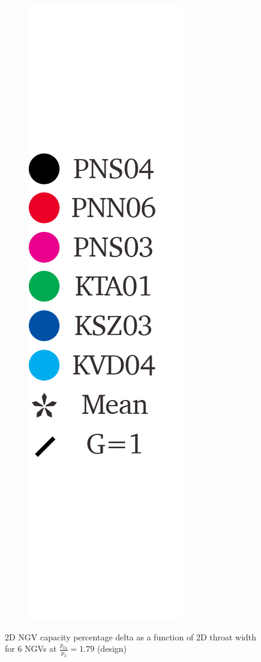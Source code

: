 \documentclass[a4paper, 11pt, oneside]{report}
\begin{document}
\begin{figure}[H]
\begin{subfigure}{.1125\textwidth}
		\includegraphics[width=\linewidth]{figs/t900_throat_widths_legend.png}
	\end{subfigure}
	\caption{2D NGV capacity percentage delta as a function of 2D throat width for 6 NGVs at $\frac{p_{01}}{p_2}=1.79$ (design)}
      \label{fig:T900_2d_capacities_vs_throat_widths}
\end{figure}
\end{document}
